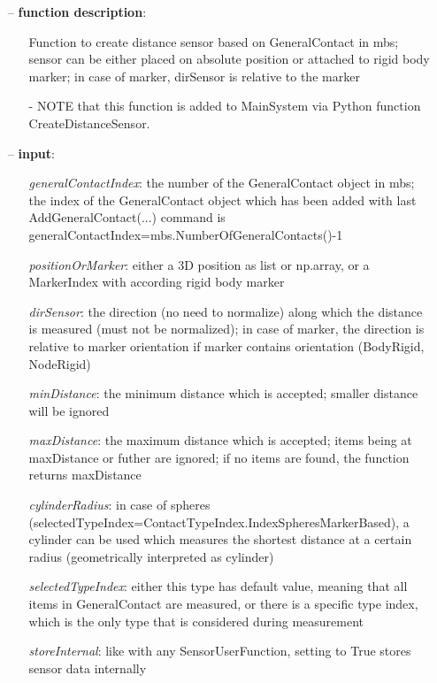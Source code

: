 \begin{itemize}[leftmargin=0.7cm]
\item[--]
{\bf function description}: \vspace{-6pt}
\begin{itemize}[leftmargin=1.2cm]
\setlength{\itemindent}{-0.7cm}
\item[]Function to create distance sensor based on GeneralContact in mbs; sensor can be either placed on absolute position or attached to rigid body marker; in case of marker, dirSensor is relative to the marker
\item[]- NOTE that this function is added to MainSystem via Python function CreateDistanceSensor.
\end{itemize}
\item[--]
{\bf input}: \vspace{-6pt}
\begin{itemize}[leftmargin=1.2cm]
\setlength{\itemindent}{-0.7cm}
\item[]{\it generalContactIndex}: the number of the GeneralContact object in mbs; the index of the GeneralContact object which has been added with last AddGeneralContact(...) command is generalContactIndex=mbs.NumberOfGeneralContacts()-1
\item[]{\it positionOrMarker}: either a 3D position as list or np.array, or a MarkerIndex with according rigid body marker
\item[]{\it dirSensor}: the direction (no need to normalize) along which the distance is measured (must not be normalized); in case of marker, the direction is relative to marker orientation if marker contains orientation (BodyRigid, NodeRigid)
\item[]{\it minDistance}: the minimum distance which is accepted; smaller distance will be ignored
\item[]{\it maxDistance}: the maximum distance which is accepted; items being at maxDistance or futher are ignored; if no items are found, the function returns maxDistance
\item[]{\it cylinderRadius}: in case of spheres (selectedTypeIndex=ContactTypeIndex.IndexSpheresMarkerBased), a cylinder can be used which measures the shortest distance at a certain radius (geometrically interpreted as cylinder)
\item[]{\it selectedTypeIndex}: either this type has default value, meaning that all items in GeneralContact are measured, or there is a specific type index, which is the only type that is considered during measurement
\item[]{\it storeInternal}: like with any SensorUserFunction, setting to True stores sensor data internally

\end{itemize}
\end{itemize}
